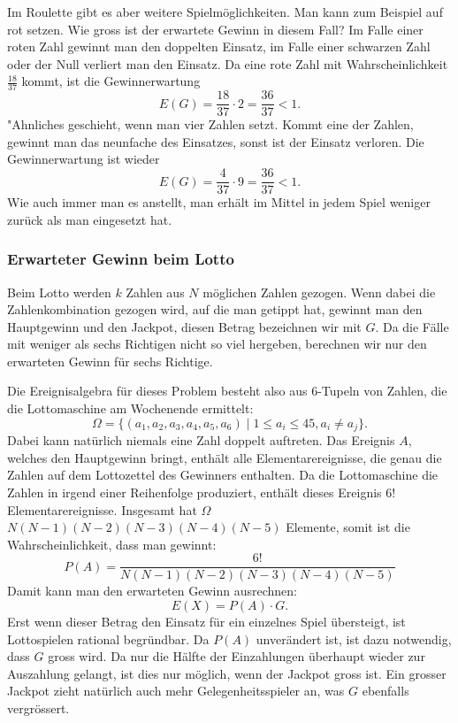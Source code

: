 Im Roulette gibt es aber weitere Spielmöglichkeiten.
Man kann zum Beispiel
auf rot setzen.
Wie gross ist der erwartete Gewinn in diesem Fall?
Im Falle einer roten Zahl gewinnt man den doppelten Einsatz,
im Falle einer schwarzen Zahl oder der Null verliert man den Einsatz.
Da eine rote Zahl mit Wahrscheinlichkeit $\frac{18}{37}$ kommt, ist
die Gewinnerwartung 
\[
E(G)=\frac{18}{37}\cdot 2=\frac{36}{37}<1.
\]
"Ahnliches geschieht, wenn man vier Zahlen setzt.
Kommt eine der Zahlen,
gewinnt man das neunfache des Einsatzes, sonst ist der Einsatz 
verloren.
Die Gewinnerwartung ist wieder
\[
E(G)=\frac{4}{37}\cdot 9=\frac{36}{37}<1.
\]
Wie auch immer man es anstellt, man erhält im Mittel in jedem Spiel
weniger zurück als man eingesetzt hat.

\subsubsection{Erwarteter Gewinn beim Lotto}
Beim Lotto werden $k$ Zahlen aus $N$ möglichen Zahlen gezogen.
Wenn dabei die Zahlenkombination gezogen wird, auf die man getippt
hat, gewinnt man den Hauptgewinn und den Jackpot, diesen Betrag bezeichnen
wir mit $G$.
Da die Fälle mit
weniger als sechs Richtigen nicht so viel hergeben, berechnen wir
nur den erwarteten Gewinn für sechs Richtige.

Die Ereignisalgebra für dieses Problem besteht also aus 
6-Tupeln von Zahlen, die die Lottomaschine am Wochenende ermittelt:
\[
\Omega=\{(a_1, a_2, a_3, a_4, a_5, a_6)\;|\;1\le a_i\le 45, a_i\ne a_j\}.
\]
Dabei kann natürlich niemals eine Zahl doppelt auftreten.
Das Ereignis $A$, welches den Hauptgewinn bringt, enthält alle
Elementarereignisse, die genau die Zahlen auf dem Lottozettel des
Gewinners enthalten.
Da die Lottomaschine die Zahlen in irgend einer
Reihenfolge produziert, enthält dieses Ereignis $6!$ Elementarereignisse.
Insgesamt hat $\Omega$ $N(N-1)(N-2)(N-3)(N-4)(N-5)$ Elemente, somit ist
die Wahrscheinlichkeit, dass man gewinnt:
\[
P(A)=\frac{6!}{N(N-1)(N-2)(N-3)(N-4)(N-5)}
\]
Damit
kann man den erwarteten Gewinn ausrechnen:
\[
E(X) = P(A)\cdot G.
\]
Erst wenn dieser Betrag den Einsatz für ein einzelnes Spiel übersteigt,
ist Lottospielen rational begründbar.
Da $P(A)$ unverändert ist,
ist dazu notwendig, dass $G$ gross wird.
Da nur die Hälfte der
Einzahlungen überhaupt wieder zur Auszahlung gelangt, ist dies nur
möglich, wenn der Jackpot gross ist.
Ein grosser Jackpot zieht natürlich
auch mehr Gelegenheitsspieler an, was $G$ ebenfalls vergrössert.

